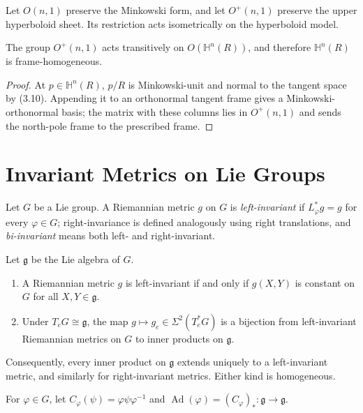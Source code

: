 Let $O(n,1)$ preserve the Minkowski form, and let $O^+(n,1)$ preserve the upper hyperboloid sheet. Its restriction acts isometrically on the hyperboloid model.

\begin{proposition}
\label{prop:lorentz-group-transitive}
The group $O^+(n,1)$ acts transitively on $O(\mathbb H^n(R))$, and therefore $\mathbb H^n(R)$ is frame-homogeneous.
\end{proposition}
\begin{proof}
\sketch At $p\in\mathbb H^n(R)$, $p/R$ is Minkowski-unit and normal to the tangent space by (3.10). Appending it to an orthonormal tangent frame gives a Minkowski-orthonormal basis; the matrix with these columns lies in $O^+(n,1)$ and sends the north-pole frame to the prescribed frame.
\end{proof}
\section{Invariant Metrics on Lie Groups}

Let $G$ be a Lie group. A Riemannian metric $g$ on $G$ is \emph{left-invariant} if
$L_\varphi^*g=g$ for every $\varphi\in G$; right-invariance is defined analogously
using right translations, and \emph{bi-invariant} means both left- and
right-invariant.

\begin{lemma}
\label{lem:left-invariant-metrics-lie-group}
Let $\mathfrak g$ be the Lie algebra of $G$.
\begin{enumerate}[label=(\alph*)]
\item A Riemannian metric $g$ is left-invariant if and only if $g(X,Y)$ is
constant on $G$ for all $X,Y\in\mathfrak g$.
\item Under $T_eG\cong\mathfrak g$, the map $g\mapsto g_e\in\Sigma^2(T_e^*G)$
is a bijection from left-invariant Riemannian metrics on $G$ to inner products
on $\mathfrak g$.
\end{enumerate}
\end{lemma}

Consequently, every inner product on $\mathfrak g$ extends uniquely to a
left-invariant metric, and similarly for right-invariant metrics. Either kind
is homogeneous.

For $\varphi\in G$, let $C_\varphi(\psi)=\varphi\psi\varphi^{-1}$ and
$\operatorname{Ad}(\varphi)=(C_\varphi)_*\colon\mathfrak g\to\mathfrak g$.

